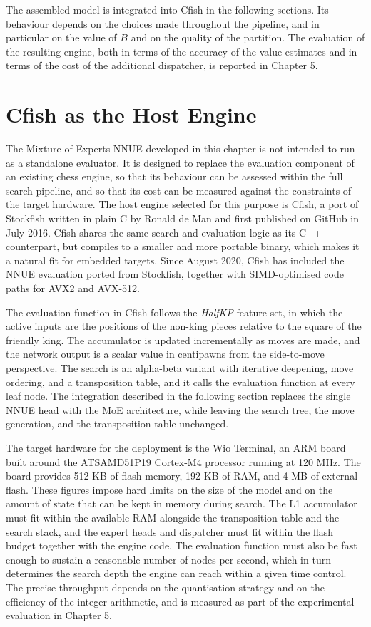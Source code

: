 The assembled model is integrated into Cfish in the following sections. Its behaviour depends on the choices made throughout the pipeline, and in particular on the value of $B$ and on the quality of the partition. The evaluation of the resulting engine, both in terms of the accuracy of the value estimates and in terms of the cost of the additional dispatcher, is reported in Chapter 5.



\section{Cfish as the Host Engine}

The Mixture-of-Experts NNUE developed in this chapter is not intended to run as a standalone evaluator. It is designed to replace the evaluation component of an existing chess engine, so that its behaviour can be assessed within the full search pipeline, and so that its cost can be measured against the constraints of the target hardware. The host engine selected for this purpose is Cfish, a port of Stockfish written in plain C by Ronald de Man and first published on GitHub in July 2016. Cfish shares the same search and evaluation logic as its C++ counterpart, but compiles to a smaller and more portable binary, which makes it a natural fit for embedded targets. Since August 2020, Cfish has included the NNUE evaluation ported from Stockfish, together with SIMD-optimised code paths for AVX2 and AVX-512.

The evaluation function in Cfish follows the \emph{HalfKP} feature set, in which the active inputs are the positions of the non-king pieces relative to the square of the friendly king. The accumulator is updated incrementally as moves are made, and the network output is a scalar value in centipawns from the side-to-move perspective. The search is an alpha-beta variant with iterative deepening, move ordering, and a transposition table, and it calls the evaluation function at every leaf node. The integration described in the following section replaces the single NNUE head with the MoE architecture, while leaving the search tree, the move generation, and the transposition table unchanged.

The target hardware for the deployment is the Wio Terminal, an ARM board built around the ATSAMD51P19 Cortex-M4 processor running at 120 MHz. The board provides 512 KB of flash memory, 192 KB of RAM, and 4 MB of external flash. These figures impose hard limits on the size of the model and on the amount of state that can be kept in memory during search. The L1 accumulator must fit within the available RAM alongside the transposition table and the search stack, and the expert heads and dispatcher must fit within the flash budget together with the engine code. The evaluation function must also be fast enough to sustain a reasonable number of nodes per second, which in turn determines the search depth the engine can reach within a given time control. The precise throughput depends on the quantisation strategy and on the efficiency of the integer arithmetic, and is measured as part of the experimental evaluation in Chapter 5.



